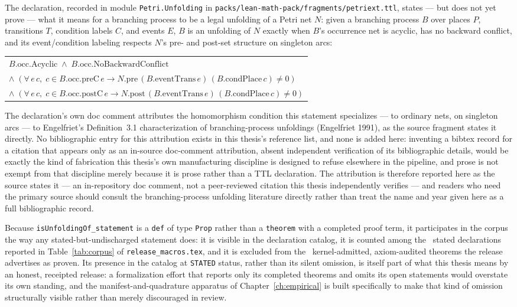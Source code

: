 The declaration, recorded in module \texttt{Petri.Unfolding} in
\texttt{packs/lean-math-pack/fragments/petriext.ttl}, states --- but does
not yet prove --- what it means for a branching process to be a legal
unfolding of a Petri net \(N\): given a branching process \(B\) over
places \(P\), transitions \(T\), condition labels \(C\), and events \(E\),
\(B\) is an unfolding of \(N\) exactly when \(B\)'s occurrence net is
acyclic, has no backward conflict, and its event/condition labeling
respects \(N\)'s pre- and post-set structure on singleton arcs:
\begin{center}
\begin{tabular}{l}
\(B.\mathrm{occ.Acyclic} \;\land\; B.\mathrm{occ.NoBackwardConflict}\)\\
\(\land\; (\forall\, e\, c,\; c \in B.\mathrm{occ.preC}\,e \to N.\mathrm{pre}\,(B.\mathrm{eventTrans}\,e)\,(B.\mathrm{condPlace}\,c) \neq 0)\)\\
\(\land\; (\forall\, e\, c,\; c \in B.\mathrm{occ.postC}\,e \to N.\mathrm{post}\,(B.\mathrm{eventTrans}\,e)\,(B.\mathrm{condPlace}\,c) \neq 0)\)
\end{tabular}
\end{center}
The declaration's own doc comment attributes the homomorphism condition
this statement specializes --- to ordinary nets, on singleton arcs --- to
Engelfriet's Definition~3.1 characterization of branching-process
unfoldings (Engelfriet 1991), as the source fragment states it directly.
No bibliographic entry for this attribution exists in this thesis's
reference list, and none is added here: inventing a bibtex record for a
citation that appears only as an in-source doc-comment attribution, absent
independent verification of its bibliographic details, would be exactly
the kind of fabrication this thesis's own manufacturing discipline is
designed to refuse elsewhere in the pipeline, and prose is not exempt
from that discipline merely because it is prose rather than a TTL
declaration. The attribution is therefore reported here as the source
states it --- an in-repository doc comment, not a peer-reviewed citation
this thesis independently verifies --- and readers who need the primary
source should consult the branching-process unfolding literature
directly rather than treat the name and year given here as a full
bibliographic record.

Because \texttt{isUnfoldingOf\_statement} is a \texttt{def} of type
\texttt{Prop} rather than a \texttt{theorem} with a completed proof term,
it participates in the corpus the way any stated-but-undischarged
statement does: it is visible in the declaration catalog, it is counted
among the \StatedCount\ stated declarations reported in
Table~\ref{tab:corpus} of \texttt{release\_macros.tex}, and it is excluded from the
\KernelTheorems\ kernel-admitted, axiom-audited theorems the release
advertises as proven. Its presence in the catalog at \texttt{STATED}
status, rather than its silent omission, is itself part of what this
thesis means by an honest, receipted release: a formalization effort that
reports only its completed theorems and omits its open statements would
overstate its own standing, and the manifest-and-quadrature apparatus of
Chapter~\ref{ch:empirical} is built specifically to make that kind of
omission structurally visible rather than merely discouraged in review.
